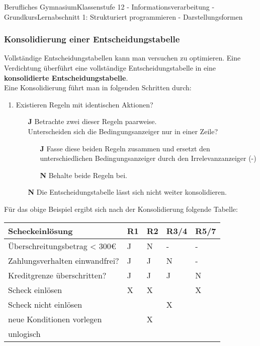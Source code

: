\documentclass[11pt,oneside,openany,headings=optiontotoc,11pt,numbers=noenddot]{article}
\begin{document}
\begin{worksheet}{Berufliches Gymnasium}{Klassenstufe 12 - Informationsverarbeitung - Grundkurs}{Lernabschnitt 1: Strukturiert programmieren - Darstellungsformen}
		\subsubsection{Konsolidierung einer Entscheidungstabelle}
		Vollständige Entscheidungstabellen kann man versuchen zu optimieren. Eine Verdichtung überführt eine vollständige Entscheidungstabelle in eine \textbf{konsolidierte Entscheidungstabelle}.\\
		Eine Konsolidierung führt man in folgenden Schritten durch:
		\begin{enumerate}
			\item Existieren Regeln mit identischen Aktionen?
			\begin{itemize}
				\item[\textbf{J}] Betrachte zwei dieser Regeln paarweise.\\
				Unterscheiden sich die Bedingungsanzeiger nur in einer Zeile?
				\begin{itemize}
					\item[\textbf{J}] Fasse diese beiden Regeln zusammen und ersetzt den unterschiedlichen Bedingungsanzeiger durch den Irrelevanzanzeiger (\grqq{}-\grqq{})
					\item[\textbf{N}] Behalte beide Regeln bei.
				\end{itemize}
				\item[\textbf{N}] Die Entscheidungstabelle lässt sich nicht weiter konsolidieren.
			\end{itemize}
		\end{enumerate}
		Für das obige Beispiel ergibt sich nach der Konsolidierung folgende Tabelle:\\
		\begin{tabularx}{\textwidth}{|l||M|M|M|M|}
			\hline
			\textbf{Scheckeinlösung} & \textbf{R1} & \textbf{R2} & \textbf{R3/4} & \textbf{R5/7}\\
			\hline
			Überschreitungsbetrag < 300\euro & J & N & - & - \\
			\hline
			Zahlungsverhalten einwandfrei? & J & J & N & - \\
			\hline
			Kreditgrenze überschritten? & J & J & J & N \\
			\hline
			\hline
			Scheck einlösen & X & X & & X \\
			\hline
			Scheck nicht einlösen & & & X & \\
			\hline
			neue Konditionen vorlegen & & X & & \\
			\hline
			unlogisch & & & & \\
			\hline
		\end{tabularx}

\end{worksheet}
\end{document}
